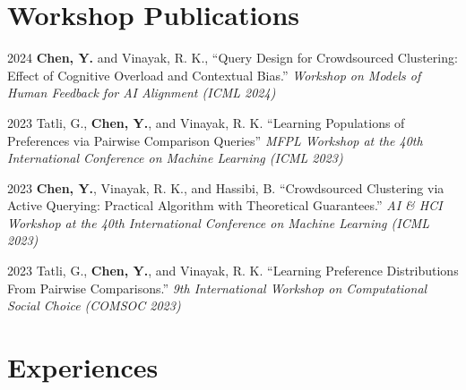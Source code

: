 \documentclass[11pt,letterpaper]{report}
\begin{document}
    \section*{Workshop Publications}
    
    \begin{tablist}


        \item[2024]  \tab{} \textbf{Chen, Y.} and Vinayak, R. K., \enquote{Query Design for Crowdsourced Clustering: Effect of Cognitive Overload and Contextual Bias.} \textit{Workshop on Models of Human Feedback for AI Alignment (ICML 2024)}

        \item[2023] \tab{}Tatli, G., \textbf{Chen, Y.}, and Vinayak, R. K. \enquote{Learning Populations of Preferences via Pairwise Comparison Queries} \textit{MFPL Workshop at the 40th International Conference on Machine Learning (ICML 2023)}

        \item[2023] \tab{}\textbf{Chen, Y.}, Vinayak, R. K., and Hassibi, B. \enquote{Crowdsourced Clustering via Active Querying: Practical Algorithm with Theoretical Guarantees.} \textit{AI \& HCI Workshop at the 40th International Conference on Machine Learning (ICML 2023)}

        \item[2023] \tab{}Tatli, G., \textbf{Chen, Y.}, and Vinayak, R. K. \enquote{Learning Preference Distributions From Pairwise Comparisons.} \textit{9th International Workshop on Computational Social Choice (COMSOC 2023)}

    \end{tablist}

    \section*{Experiences}
\end{document}
